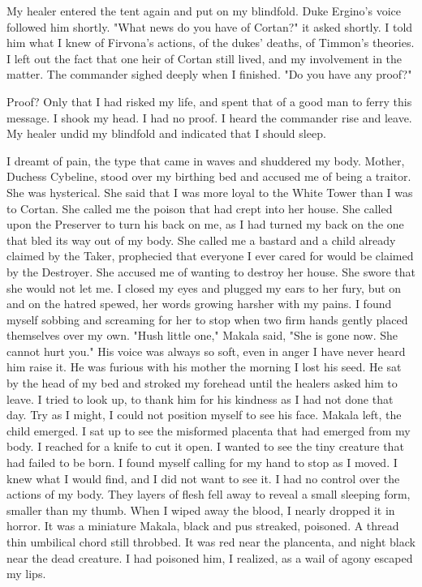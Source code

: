 \documentclass{article}
\begin{document}
My healer entered the tent again and put on my blindfold. Duke Ergino's voice followed him shortly. "What news do you have of Cortan?" it asked shortly.
I told him what I knew of Firvona's actions, of the dukes' deaths, of Timmon's theories. I left out the fact that one heir of Cortan still lived, and my involvement in the matter. The commander sighed deeply when I finished. "Do you have any proof?"

Proof? Only that I had risked my life, and spent that of a good man to ferry this message. I shook my head. I had no proof. I heard the commander rise and leave. My healer undid my blindfold and indicated that I should sleep.

I dreamt of pain, the type that came in waves and shuddered my body. Mother, Duchess Cybeline, stood over my birthing bed and accused me of being a traitor. She was hysterical. She said that I was more loyal to the White Tower than I was to Cortan. She called me the poison that had crept into her house. She called upon the Preserver to turn his back on me, as I had turned my back on the one that bled its way out of my body. She called me a bastard and a child already claimed by the Taker, prophecied that everyone I ever cared for would be claimed by the Destroyer. She accused me of wanting to destroy her house. She swore that she would not let me. I closed my eyes and plugged my ears to her fury, but on and on the hatred spewed, her words growing harsher with my pains. I found myself sobbing and screaming for her to stop when two firm hands gently placed themselves over my own. "Hush little one," Makala said, "She is gone now. She cannot hurt you." His voice was always so soft, even in anger I have never heard him raise it. He was furious with his mother the morning I lost his seed. He sat by the head of my bed and stroked my forehead until the healers asked him to leave. I tried to look up, to thank him for his kindness as I had not done that day. Try as I might, I could not position myself to see his face. Makala left, the child emerged. I sat up to see the misformed placenta that had emerged from my body. I reached for a knife to cut it open. I wanted to see the tiny creature that had failed to be born. I found myself calling for my hand to stop as I moved. I knew what I would find, and I did not want to see it. I had no control over the actions of my body. They layers of flesh fell away to reveal a small sleeping form, smaller than my thumb. When I wiped away the blood, I nearly dropped it in horror. It was a miniature Makala, black and pus streaked, poisoned. A thread thin umbilical chord still throbbed. It was red near the plancenta, and night black near the dead creature. I had poisoned him, I realized, as a wail of agony escaped my lips. 
\end{document}
